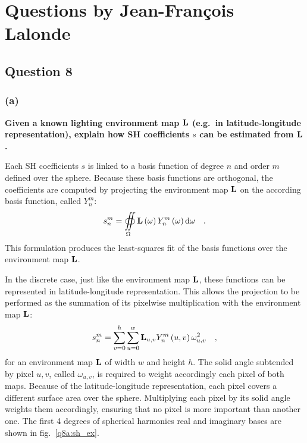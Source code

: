 \documentclass{report}
\begin{document}
\chapter{Questions by Jean-François Lalonde}

\section{Question 8}
\subsection{(a)}
\textbf{Given a known lighting environment map $\mathbf{L}$ (e.g.\ in latitude-longitude representation), explain how SH coefficients $s$ can be estimated from $\mathbf{L}$.}

Each SH coefficients $s$ is linked to a basis function of degree $n$ and order $m$ defined over the sphere. Because these basis functions are orthogonal, the coefficients are computed by projecting the environment map $\mathbf{L}$ on the according basis function, called $Y_n^m$:
\begin{equation}
s_n^m = \oiint\limits_{\Omega} \mathbf{L}\left(\mathbf{\omega} \right) Y_n^m \left( \mathbf{\omega} \right) \mathrm{d} \mathbf{\omega}   \quad.
\end{equation}
This formulation produces the least-squares fit of the basis functions over the environment map $\mathbf{L}$.

In the discrete case, just like the environment map $\mathbf{L}$, these functions can be represented in latitude-longitude representation. This allows the projection to be performed as the summation of its pixelwise multiplication with the environment map $\mathbf{L}$:
\begin{equation}
s_n^m = \sum_{v=0}^{h} \sum_{u=0}^{w} \mathbf{L}_{u,v} Y_n^m\left(u, v\right) \omega_{u,v}^2 \quad,
\end{equation}
for an environment map $\mathbf{L}$ of width $w$ and height $h$. The solid angle subtended by pixel $u,v$, called $\omega_{u,v}$, is required to weight accordingly each pixel of both maps. Because of the latitude-longitude representation, each pixel covers a different surface area over the sphere. Multiplying each pixel by its solid angle weights them accordingly, ensuring that no pixel is more important than another one. The first 4 degrees of spherical harmonics real and imaginary bases are shown in fig.~\ref{q8a:sh_ex}.
\end{document}

